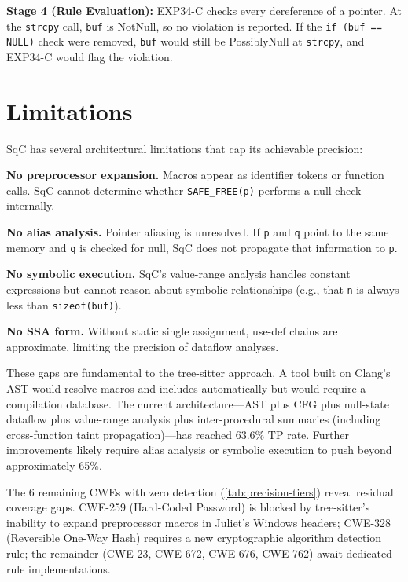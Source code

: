 \documentclass[10pt,twocolumn,letterpaper]{article}
\begin{document}
\textbf{Stage 4 (Rule Evaluation):} EXP34-C checks every dereference
of a pointer.  At the \texttt{strcpy} call, \texttt{buf} is NotNull,
so no violation is reported.  If the \texttt{if (buf == NULL)} check
were removed, \texttt{buf} would still be PossiblyNull at \texttt{strcpy},
and EXP34-C would flag the violation.

\section{Limitations}
\label{sec:limitations}

SqC has several architectural limitations that cap its achievable
precision:

\textbf{No preprocessor expansion.}  Macros appear as identifier
tokens or function calls.  SqC cannot determine whether
\texttt{SAFE\_FREE(p)} performs a null check internally.

\textbf{No alias analysis.}  Pointer aliasing is unresolved.  If
\texttt{p} and \texttt{q} point to the same memory and \texttt{q}
is checked for null, SqC does not propagate that information to
\texttt{p}.

\textbf{No symbolic execution.}  SqC's value-range analysis handles
constant expressions but cannot reason about symbolic relationships
(e.g., that \texttt{n} is always less than \texttt{sizeof(buf)}).

\textbf{No SSA form.}  Without static single assignment, use-def
chains are approximate, limiting the precision of dataflow analyses.

These gaps are fundamental to the tree-sitter approach.  A tool built
on Clang's AST would resolve macros and includes automatically but
would require a compilation database.  The current architecture---AST
plus CFG plus null-state dataflow plus value-range analysis plus
inter-procedural summaries (including cross-function taint
propagation)---has reached 63.6\% TP rate.  Further improvements
likely require alias analysis or symbolic execution to push beyond
approximately 65\%.

The 6 remaining CWEs with zero detection (\cref{tab:precision-tiers})
reveal residual coverage gaps.  CWE-259 (Hard-Coded Password) is
blocked by tree-sitter's inability to expand preprocessor macros in
Juliet's Windows headers; CWE-328 (Reversible One-Way Hash) requires
a new cryptographic algorithm detection rule; the remainder (CWE-23,
CWE-672, CWE-676, CWE-762) await dedicated rule implementations.
\end{document}
